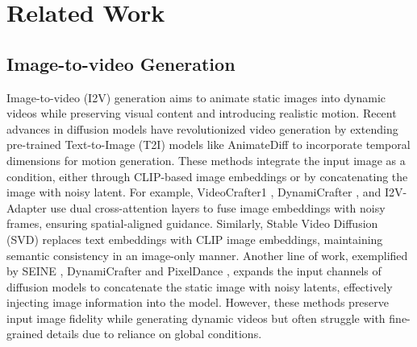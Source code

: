 \section{Related Work}
\subsection{Image-to-video Generation}
Image-to-video (I2V) generation \cite{guo2023animatediff,chen2023videocrafter1,chen2024videocrafter2,xing2025dynamicrafter,guo2024i2v,guo2024sparsectrl} aims to animate static images into dynamic videos while preserving visual content and introducing realistic motion. 
Recent advances in diffusion models \cite{sohl2015deep,ho2020denoising}  have revolutionized video generation by extending pre-trained Text-to-Image (T2I) models like AnimateDiff \cite{guo2023animatediff} to incorporate temporal dimensions for motion generation.
These methods integrate the input image as a condition, either through CLIP-based \cite{radford2021learning} image embeddings or by concatenating the image with noisy latent. For example, VideoCrafter1 \cite{chen2023videocrafter1}, DynamiCrafter \cite{xing2025dynamicrafter}, and I2V-Adapter \cite{guo2024i2v} use dual cross-attention layers to fuse image embeddings with noisy frames, ensuring spatial-aligned guidance. Similarly, Stable Video Diffusion (SVD) \cite{blattmann2023stable} replaces text embeddings with CLIP image embeddings, maintaining semantic consistency in an image-only manner.
Another line of work, exemplified by SEINE \cite{chen2023seine}, DynamiCrafter \cite{xing2025dynamicrafter} and PixelDance \cite{zeng2024make}, expands the input channels of diffusion models to concatenate the static image with noisy latents, effectively injecting image information into the model. 
However, these methods preserve input image fidelity while generating dynamic videos but often struggle with fine-grained details due to reliance on global conditions. 


